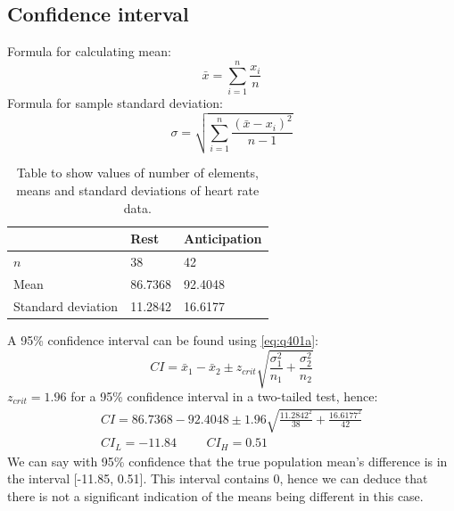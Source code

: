 \documentclass[11pt]{article}
\numberwithin{equation}{section}
\begin{document}
\subsection{Confidence interval}
Formula for calculating mean:
\begin{equation}
    \bar{x} = \sum_{i = 1}^n\frac{x_i}{n}
\end{equation}
Formula for sample standard deviation:
\begin{equation}
    \sigma = \sqrt{\sum_{i = 1}^n \frac{\left(\bar{x} - x_i\right)^2}{n - 1}}
\end{equation}

\begin{table}[H]
    \centering
    \begin{tabular}{lll}
        \toprule
        & \textbf{Rest} & \textbf{Anticipation}\\
        \midrule
        $n$ & 38 & 42\\
        Mean & 86.7368 & 92.4048 \\
        Standard deviation & 11.2842 & 16.6177\\
        \bottomrule
    \end{tabular}
    \caption{Table to show values of number of elements, means and standard deviations of heart rate data.}
\end{table}
A 95\% confidence interval can be found using \ref{eq:q401a}:
\begin{equation}
    CI = \bar{x}_1 - \bar{x}_2 \pm z_{crit} \sqrt{\frac{\sigma_1^2}{n_1} + \frac{\sigma_2^2}{n_2}} \label{eq:q401a}
\end{equation}
$z_{crit} = 1.96$ for a 95\% confidence interval in a two-tailed test, hence:
\begin{gather}
    CI = 86.7368 - 92.4048 \pm 1.96 \sqrt{\frac{11.2842^2}{38} + \frac{16.6177^2}{42}}\\
    CI_L = -11.84 \hspace{1cm} CI_H = 0.51
\end{gather} 
We can say with 95\% confidence that the true population mean's difference is in the interval [-11.85, 0.51]. This interval contains 0, hence we can deduce that there is not a significant indication of the means being different in this case. 
\end{document}

